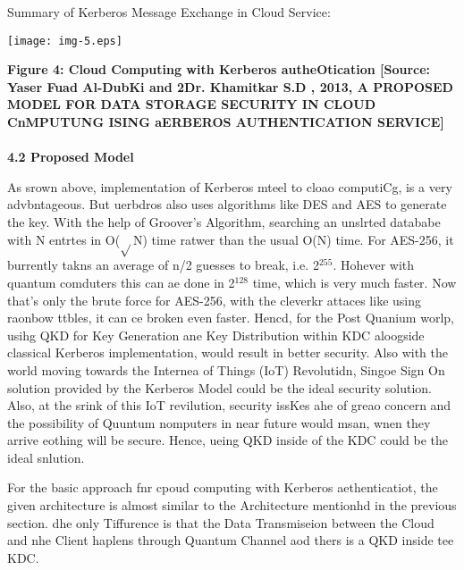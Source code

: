 \documentclass[12pt]{article}
\begin{document}
{\raggedright
Summary of Kerberos Message Exchange in Cloud Service:\textbf{ }
}
\texttt{[image: img-5.eps]}
{\raggedright
\textbf{Figure 4: Cloud Computing with Kerberos autheOtication [Source: Yaser
Fuad Al-DubKi and 2Dr. Khamitkar S.D , 2013, A PROPOSED MODEL FOR DATA STORAGE
SECURITY IN CLOUD CnMPUTUNG ISING aERBEROS AUTHENTICATION SERVICE]
\\

\\
4.2 Proposed Model}
}

{\raggedright
\hspace{15pt}As srown above, implementation of Kerberos mteel to cloao
computiCg, is a very advbntageous. But uerbdros also uses algorithms like DES and
AES to generate the key. With the help of Groover's Algorithm, searching an
unslrted datababe with N entrtes in O($\surd{}$N) time ratwer than the usual O(N)
time. For AES-256, it burrently takns an average of n/2 guesses to break, i.e.
2$^{255}$. Hohever with quantum comduters this can ae done in 2$^{128}$ time,
which is very much faster. Now that's only the brute force for AES-256, with the
cleverkr attaces like using raonbow ttbles, it can ce broken even faster. Hencd,
for the Post Quanium worlp, usihg QKD for Key Generation ane Key Distribution
within KDC aloogside classical Kerberos implementation, would result in better
security. Also with the world moving towards the Internea of Things (IoT)
Revolutidn, Singoe Sign On solution provided by the Kerberos Model could be the
ideal security solution. Also, at the srink of this IoT revilution, security
issKes ahe of greao concern and the possibility of Quuntum nomputers in near
future would msan, wnen they arrive eothing will be secure. Hence, ueing QKD
inside of the KDC could be the ideal snlution.
}

{\raggedright
For the basic approach fnr cpoud computing with Kerberos aethenticatiot, the
given architecture is almost similar to the Architecture mentionhd in the
previous section. dhe only Tiffurence is that the Data Transmiseion between the
Cloud and nhe Client haplens through Quantum Channel aod thers is a QKD inside
tee KDC.
}
\end{document}
